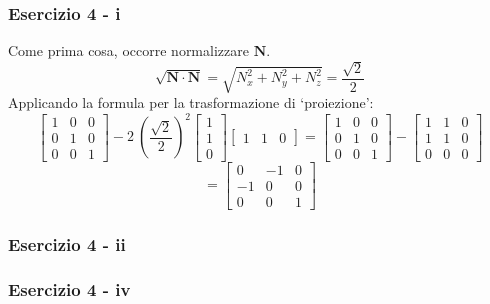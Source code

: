 \documentclass{beamer}
\newcommand{\fig}{figures}
\begin{document}
\begin{frame}
\frametitle {Esercizio 4 - i}
Come prima cosa, occorre normalizzare $\textbf{N}$.
\begin{displaymath}
\sqrt{\mathbf{N} \cdot \mathbf{N}} =\sqrt{ N_x^2+N_y^2+N_z^2}=\frac{\sqrt{2}}{2}
\end{displaymath}
Applicando la formula per la trasformazione di `proiezione':
\begin{displaymath}
\begin{bmatrix}
1 & 0 & 0 \\
0 & 1 & 0 \\ 
0 & 0 & 1 
\end{bmatrix}
- 2~ \left(\frac{\sqrt{2}}{2}\right)^2
\begin{bmatrix}
1 \\
1 \\ 
0 
\end{bmatrix}
\begin{bmatrix}
1 & 1 &  0
\end{bmatrix}
= 
\begin{bmatrix}
1 & 0 & 0 \\
0 & 1 & 0 \\ 
0 & 0 & 1 
\end{bmatrix}
-
\begin{bmatrix}
1 & 1 & 0 \\
1 & 1 & 0 \\ 
0 & 0 & 0 
\end{bmatrix}
\end{displaymath}
{\color[rgb]{0.1,0,1}
\begin{displaymath}
=
\begin{bmatrix}
0  & -1 & 0 \\
-1 &  0 & 0 \\ 
0  &  0 & 1 
\end{bmatrix}
\end{displaymath}
}

\end{frame}
\begin{frame}
\frametitle{Esercizio 4 - ii}
\begin{center}
\end{center}
\end{frame}
\begin{frame}
\frametitle{Esercizio 4 - iv}
\begin{center}
\end{center}
\end{frame}
\end{document}

